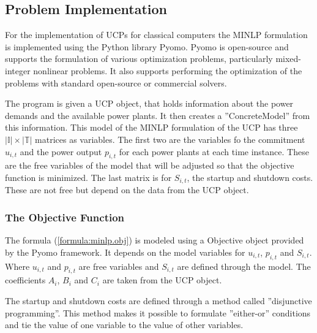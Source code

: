 \subsection{Problem Implementation}

For the implementation of UCPs for classical computers
the MINLP formulation is implemented using the Python library Pyomo.
Pyomo is open-source and supports the formulation of various optimization problems,
particularly mixed-integer nonlinear problems.
It also supports performing the optimization of the problems
with standard open-source or commercial solvers.
\cite{hart2011pyomo}

The program is given a UCP object, that holds information
about the power demands and the available power plants.
It then creates a ''ConcreteModel'' from this information.
This model of the MINLP formulation of the UCP
has three $| \mathbb{I} | \times | \mathbb{T} |$ matrices as variables.
The first two are the variables fo the commitment $u_{i, t}$
and the power output $p_{i, t}$ for each power plants at each time instance.
These are the free variables of the model that will be adjusted so that the objective function is minimized.
The last matrix is for $S_{i, t}$, the startup and shutdown costs.
These are not free but depend on the data from the UCP object.


\subsubsection{The Objective Function}

The formula (\ref{formula:minlp.obj}) is modeled using a Objective object provided by the Pyomo framework.
It depends on the model variables for $u_{i, t}$, $p_{i, t}$ and $S_{i, t}$.
Where $u_{i, t}$ and $p_{i, t}$ are free variables and $S_{i, t}$ are defined through the model.
The coefficients $A_i$, $B_i$ and $C_i$ are taken from the UCP object.


The startup and shutdown costs are defined through a method called ''disjunctive programming''.
This method makes it possible to formulate ''either-or'' conditions
and tie the value of one variable to the value of other variables.
\cite{Balas1983}

